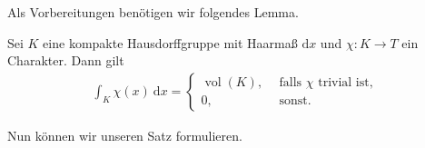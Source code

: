 Als Vorbereitungen benötigen wir folgendes Lemma.
\begin{lem}
Sei $K$ eine kompakte Hausdorffgruppe mit Haarmaß $\mathrm{d}x$ und $\chi \colon K\to T$ ein Charakter. Dann gilt
\begin{align*}
\int_K \chi(x)~\mathrm{d}x=\begin{cases}
\operatorname{vol}(K),~~&\text{falls } \chi \text{ trivial ist},\\
0,&\text{sonst.}
\end{cases}
\end{align*}
\end{lem}

Nun können wir unseren Satz formulieren.

